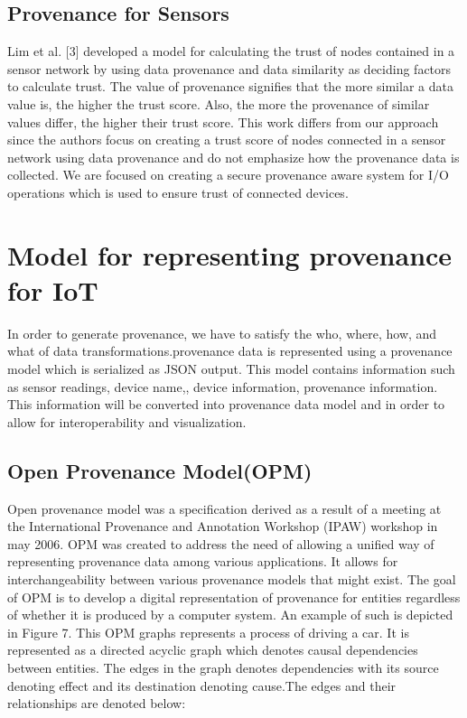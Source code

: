 \subsection{Provenance for Sensors}
Lim et al. [3] developed a
model for calculating the trust of nodes contained in a sensor network by using data
provenance and data similarity as deciding factors to calculate trust. The value of
provenance signifies that the more similar a data value is, the higher the trust score.
Also, the more the provenance of similar values differ, the higher their trust score.
This work differs from our approach since the authors focus on creating a trust score
of nodes connected in a sensor network using data provenance and do not emphasize
how the provenance data is collected. We are focused on creating a secure
provenance aware system for I/O operations which is used to ensure trust of
connected devices.




\section{Model for representing provenance for IoT}

In order to generate provenance, we have to satisfy the who, where, how, and what of data transformations.provenance data is represented using a provenance model which is serialized as JSON output. This model contains information such as sensor readings, device name,, device information, provenance information. This information will be converted into provenance data model and in order to allow for interoperability and visualization.

\subsection{Open Provenance Model(OPM)}

Open provenance model was a specification derived as a result of a meeting at the International Provenance and Annotation Workshop (IPAW) workshop in may 2006. OPM was created to address the need of allowing a unified way of representing provenance data among various applications. It allows for interchangeability between various provenance models that might exist. The goal of OPM is to develop a digital representation of provenance for entities regardless of whether it is produced by a computer system. An example of such is depicted in Figure 7. This OPM graphs represents a process of driving a car. It is represented as a directed acyclic graph which denotes causal dependencies between entities. The edges in the graph denotes dependencies with its source denoting effect and its destination denoting cause.The edges and their relationships are denoted below: 

